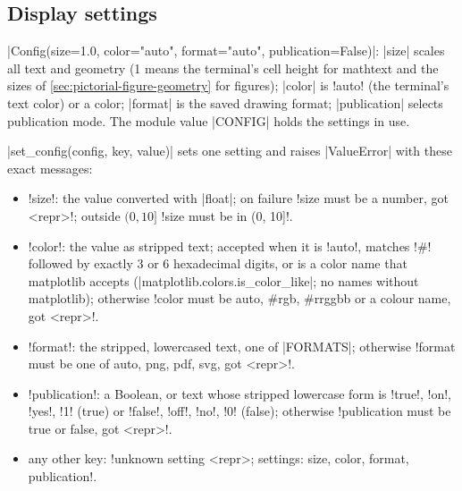 {\subsection{Display settings}\label{sec:pictorial-config}

\begin{definition}\label{def:pictorial-config}
\py|Config(size=1.0, color="auto", format="auto", publication=False)|:
\py|size| scales all text and geometry (1 means the terminal's cell height for mathtext and the
sizes of \cref{sec:pictorial-figure-geometry} for figures); \py|color| is \code!auto! (the
terminal's text color) or a color; \py|format| is the saved drawing format; \py|publication|
selects publication mode. The module value \py|CONFIG| holds the settings in use.
\end{definition}

\py|set_config(config, key, value)| sets one setting and raises \py|ValueError| with these exact
messages:
\begin{itemize}
  \item \code!size!: the value converted with \py|float|; on failure
    \code!size must be a number, got <repr>!; outside $(0, 10]$
    \code!size must be in (0, 10]!.
  \item \code!color!: the value as stripped text; accepted when it is \code!auto!, matches
    \code!#! followed by exactly 3 or 6 hexadecimal digits, or is a color name that matplotlib
    accepts (\py|matplotlib.colors.is_color_like|; no names without matplotlib); otherwise
    \code!color must be auto, #rgb, #rrggbb or a colour name, got <repr>!.
  \item \code!format!: the stripped, lowercased text, one of \py|FORMATS|; otherwise
    \code!format must be one of auto, png, pdf, svg, got <repr>!.
  \item \code!publication!: a Boolean, or text whose stripped lowercase form is \code!true!,
    \code!on!, \code!yes!, \code!1! (true) or \code!false!, \code!off!, \code!no!, \code!0!
    (false); otherwise \code!publication must be true or false, got <repr>!.
  \item any other key: \code!unknown setting <repr>; settings: size, color, format, publication!.
\end{itemize}

}

